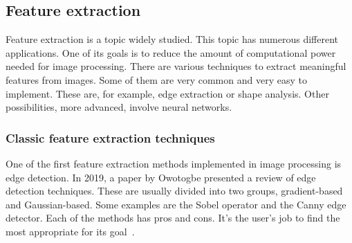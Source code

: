 \documentclass[conference]{IEEEtran}
\begin{document}
	\subsection{Feature extraction}

		Feature extraction is a topic widely studied. 
		This topic has numerous different applications. 
		One of its goals is to reduce the amount of computational power needed for image processing. 
		There are various techniques to extract meaningful features from images. 
		Some of them are very common and very easy to implement. 
		These are, for example, edge extraction or shape analysis. 
		Other possibilities, more advanced, involve neural networks.\\

			\subsubsection{Classic feature extraction techniques}
				
				One of the first feature extraction methods implemented in image processing is edge detection.				
				In 2019, a paper by Owotogbe presented a review of edge detection techniques. 
				These are usually divided into two groups, gradient-based and Gaussian-based. 
				Some examples are the Sobel operator and the Canny edge detector. 
				Each of the methods has pros and cons. 
				It's the user's job to find the most appropriate for its goal~\cite{owotogbe2019edge}.\\
				
\end{document}
